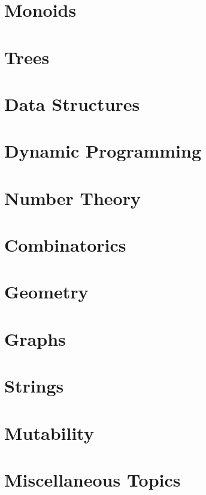 \documentclass{book}
\begin{document}
\chapter{Monoids}
\label{chap:monoids}

\chapter{Trees}
\label{chap:trees}

\chapter{Data Structures}
\label{chap:data-structures}

\chapter{Dynamic Programming}
\label{chap:dp}

\chapter{Number Theory}
\label{chap:number-theory}

\chapter{Combinatorics}
\label{chap:combinatorics}

\chapter{Geometry}
\label{chap:geometry}

\chapter{Graphs}
\label{chap:graphs}

\chapter{Strings}
\label{chap:strings}

\chapter{Mutability}
\label{chap:mutability}

\chapter{Miscellaneous Topics}
\label{chap:misc}

\printbibliography
\end{document}
